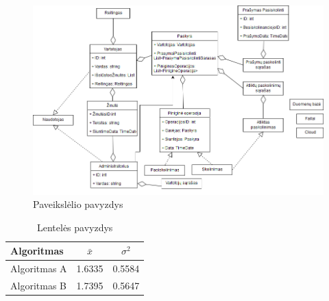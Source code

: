\documentclass{VUMIFPSkursinis}
\begin{document}
\begin{figure}[H]
    \centering
    \includegraphics[scale=0.5]{img/DomainModel}
    \caption{Paveikslėlio pavyzdys}
    \label{img:mlp}
\end{figure}

\begin{table}[H]\footnotesize
  \centering
  \caption{Lentelės pavyzdys}
  {\begin{tabular}{|l|c|c|} \hline
    Algoritmas & $\bar{x}$ & $\sigma^{2}$ \\
    \hline
    Algoritmas A  & 1.6335    & 0.5584       \\
    Algoritmas B  & 1.7395    & 0.5647       \\
    \hline
  \end{tabular}}
  \label{tab:table example}
\end{table}
\end{document}
